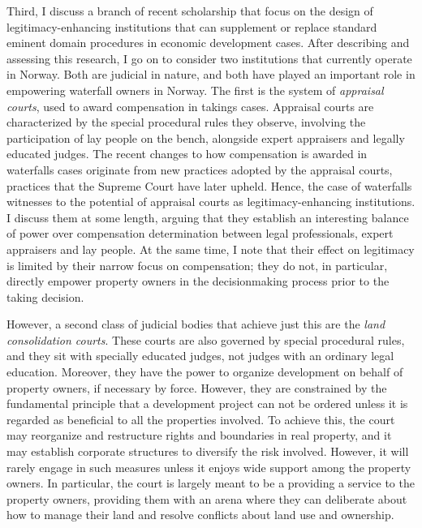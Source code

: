 \documentclass[12pt,a4paper]{article} %
\begin{document}
Third, I discuss a branch of recent scholarship that focus on the design of legitimacy-enhancing institutions that can supplement or replace standard eminent domain procedures in economic development cases. After describing and assessing this research, I go on to consider two institutions that currently operate in Norway. Both are judicial in nature, and both have played an important role in empowering waterfall owners in Norway. The first is the system of {\it appraisal courts}, used to award compensation in takings cases. Appraisal courts are characterized by the special procedural rules they observe, involving the participation of lay people on the bench, alongside expert appraisers and legally educated judges. The recent changes to how compensation is awarded in waterfalls cases originate from new practices adopted by the appraisal courts, practices that the Supreme Court have later upheld. Hence, the case of waterfalls witnesses to the potential of appraisal courts as legitimacy-enhancing institutions. I discuss them at some length, arguing that they establish an interesting balance of power over compensation determination between legal professionals, expert appraisers and lay people. At the same time, I note that their effect on legitimacy is limited by their narrow focus on compensation; they do not, in particular, directly empower property owners in the decisionmaking process prior to the taking decision.  

However, a second class of judicial bodies that achieve just this are the {\it land consolidation courts}. These courts are also governed by special procedural rules, and they sit with specially educated judges, not judges with an ordinary legal education. Moreover, they have the power to organize development on behalf of property owners, if necessary by force. However, they are constrained by the fundamental principle that a development project can not be ordered unless it is regarded as beneficial to all the properties involved. To achieve this, the court may reorganize and restructure rights and boundaries in real property, and it may establish corporate structures to diversify the risk involved. However, it will rarely engage in such measures unless it enjoys wide support among the property owners. In particular, the court is largely meant to be a providing a service to the property owners, providing them with an arena where they can deliberate about how to manage their land and resolve conflicts about land use and ownership.
\end{document}
